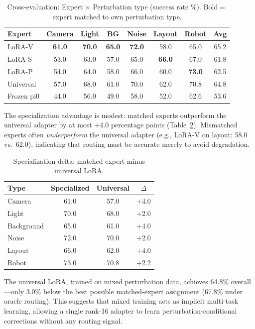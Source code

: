 \documentclass[letterpaper]{article}
\begin{document}
\begin{table}[h]
\centering
\caption{Cross-evaluation: Expert $\times$ Perturbation type (success rate \%).
Bold$=$expert matched to own perturbation type.}
\label{tab:cross_eval}
\begin{tabular}{lccccccc}
\toprule
Expert & Camera & Light & BG & Noise & Layout & Robot & Avg \\
\midrule
LoRA-V & \textbf{61.0} & \textbf{70.0} & \textbf{65.0} & \textbf{72.0} & 58.0 & 65.0 & 65.2 \\
LoRA-S & 53.0 & 63.0 & 57.0 & 65.0 & \textbf{66.0} & 67.0 & 61.8 \\
LoRA-P & 54.0 & 64.0 & 58.0 & 66.0 & 60.0 & \textbf{73.0} & 62.5 \\
Universal & 57.0 & 68.0 & 61.0 & 70.0 & 62.0 & 70.8 & 64.8 \\
Frozen pi0 & 44.0 & 56.0 & 49.0 & 58.0 & 52.0 & 62.6 & 53.6 \\
\bottomrule
\end{tabular}
\end{table}

The specialization advantage is modest: matched experts outperform the universal adapter by at most +4.0 percentage points (Table~\ref{tab:spec_delta}).
Mismatched experts often \emph{underperform} the universal adapter (e.g., LoRA-V on layout: 58.0 vs.\ 62.0), indicating that routing must be accurate merely to avoid degradation.

\begin{table}[h]
\centering
\caption{Specialization delta: matched expert minus universal LoRA.}
\label{tab:spec_delta}
\begin{tabular}{lccc}
\toprule
Type & Specialized & Universal & $\Delta$ \\
\midrule
Camera & 61.0 & 57.0 & +4.0 \\
Light & 70.0 & 68.0 & +2.0 \\
Background & 65.0 & 61.0 & +4.0 \\
Noise & 72.0 & 70.0 & +2.0 \\
Layout & 66.0 & 62.0 & +4.0 \\
Robot & 73.0 & 70.8 & +2.2 \\
\bottomrule
\end{tabular}
\end{table}

The universal LoRA, trained on mixed perturbation data, achieves 64.8\% overall---only 3.0\% below the best possible matched-expert assignment (67.8\% under oracle routing).
This suggests that mixed training acts as implicit multi-task learning, allowing a single rank-16 adapter to learn perturbation-conditional corrections without any routing signal.
\end{document}
